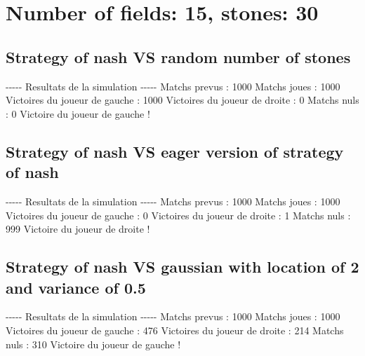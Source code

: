 \documentclass{article}%
\begin{document}
%
\section{Number of fields: 15, stones: 30}%
\label{sec:Number of fields 15, stones 30}%
\subsection{Strategy of nash VS random number of stones}%
\label{subsec:Strategy of nash VS random number of stones}%
{-}{-}{-}{-}{-} Resultats de la simulation {-}{-}{-}{-}{-}\newline%
		\newline%
Matchs prevus : 1000\newline%
Matchs joues : 1000\newline%
\newline%
Victoires du joueur de gauche : 1000\newline%
Victoires du joueur de droite : 0\newline%
Matchs nuls : 0\newline%
\newline%
Victoire du joueur de gauche !

%
\subsection{Strategy of nash VS eager version of strategy of nash}%
\label{subsec:Strategy of nash VS eager version of strategy of nash}%
{-}{-}{-}{-}{-} Resultats de la simulation {-}{-}{-}{-}{-}\newline%
		\newline%
Matchs prevus : 1000\newline%
Matchs joues : 1000\newline%
\newline%
Victoires du joueur de gauche : 0\newline%
Victoires du joueur de droite : 1\newline%
Matchs nuls : 999\newline%
\newline%
Victoire du joueur de droite !

%
\subsection{Strategy of nash VS gaussian with location of 2 and variance of 0.5}%
\label{subsec:Strategy of nash VS gaussian with location of 2 and variance of 0.5}%
{-}{-}{-}{-}{-} Resultats de la simulation {-}{-}{-}{-}{-}\newline%
		\newline%
Matchs prevus : 1000\newline%
Matchs joues : 1000\newline%
\newline%
Victoires du joueur de gauche : 476\newline%
Victoires du joueur de droite : 214\newline%
Matchs nuls : 310\newline%
\newline%
Victoire du joueur de gauche !
\end{document}
